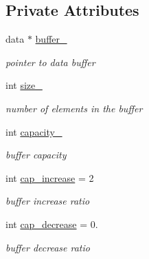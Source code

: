 \subsection*{Private Attributes}
\begin{DoxyCompactItemize}
\item 
\mbox{\label{classVector_a22db58ae9e92c6014e8ac657804a035a}} 
data $\ast$ \hyperlink{classVector_a22db58ae9e92c6014e8ac657804a035a}{buffer\+\_\+}
\begin{DoxyCompactList}\small\item\em pointer to data buffer \end{DoxyCompactList}\item 
\mbox{\label{classVector_a3c70fa478530a90177f2a7e7621ee688}} 
int \hyperlink{classVector_a3c70fa478530a90177f2a7e7621ee688}{size\+\_\+}
\begin{DoxyCompactList}\small\item\em number of elements in the buffer \end{DoxyCompactList}\item 
\mbox{\label{classVector_ad75911bb39018821f0e2911b6905b7ec}} 
int \hyperlink{classVector_ad75911bb39018821f0e2911b6905b7ec}{capacity\+\_\+}
\begin{DoxyCompactList}\small\item\em buffer capacity \end{DoxyCompactList}\item 
\mbox{\label{classVector_a1a14de1885d52d2cbe3259a865b32e7b}} 
int \hyperlink{classVector_a1a14de1885d52d2cbe3259a865b32e7b}{cap\+\_\+increase} = 2
\begin{DoxyCompactList}\small\item\em buffer increase ratio \end{DoxyCompactList}\item 
\mbox{\label{classVector_a8d3afe7fa8f956f73f37772b15548293}} 
int \hyperlink{classVector_a8d3afe7fa8f956f73f37772b15548293}{cap\+\_\+decrease} = 0.
\begin{DoxyCompactList}\small\item\em buffer decrease ratio \end{DoxyCompactList}\end{DoxyCompactItemize}


